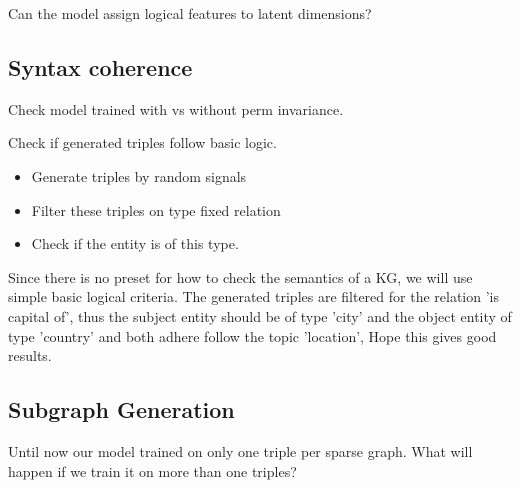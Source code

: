 Can the model assign logical features to latent dimensions?


\subsection{Syntax coherence}

Check model trained with vs without perm invariance.

Check if generated triples follow basic logic.
\begin{itemize}
    \item Generate triples by random signals
    \item Filter these triples on type fixed relation
    \item Check if the entity is of this type.
\end{itemize}

Since there is no preset for how to check the semantics of a KG, we will use simple basic logical criteria.
The generated triples are filtered for the relation 'is capital of', thus the subject entity should be of type 'city' and the object entity of type 'country' and both adhere follow the topic 'location',
Hope this gives good results.


\subsection{Subgraph Generation}

Until now our model trained on only one triple per sparse graph. What will happen if we train it on more than one triples?
